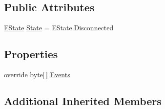 \subsection*{Public Attributes}
\begin{DoxyCompactItemize}
\item 
\hyperlink{classgearit_1_1src_1_1_network_1_1_network_client_a8c5d63a28969b69f509466b1e2138aee}{E\+State} \hyperlink{classgearit_1_1src_1_1_network_1_1_network_client_a3117b735052b922fb7376bd13f85b740}{State} = E\+State.\+Disconnected
\end{DoxyCompactItemize}
\subsection*{Properties}
\begin{DoxyCompactItemize}
\item 
override byte\mbox{[}$\,$\mbox{]} \hyperlink{classgearit_1_1src_1_1_network_1_1_network_client_a701aff727a060db8b87bba8cf16342ad}{Events}
\end{DoxyCompactItemize}
\subsection*{Additional Inherited Members}


